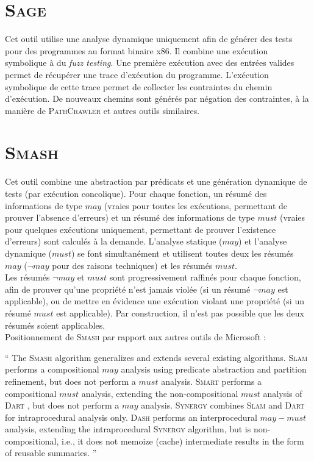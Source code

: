 \section{\textsc{Sage}}

Cet outil \cite{SAGE} utilise une analyse dynamique uniquement afin de générer
des tests pour des programmes au format binaire x86. Il combine une exécution
symbolique à du {\em fuzz testing}. Une première exécution avec des entrées
valides permet de récupérer une trace d'exécution du programme. L'exécution
symbolique de cette trace permet de collecter les contraintes du chemin
d'exécution. De nouveaux chemins sont générés par négation des contraintes,
à la manière de \textsc{PathCrawler} \cite{PathCrawler} et autres outils
similaires.

\section{\textsc{Smash}}

Cet outil \cite{SMASH} combine une abstraction par prédicats et une génération
dynamique de tests (par exécution concolique). Pour chaque fonction, un résumé
des informations de type $may$ (vraies pour toutes les exécutions, permettant de
prouver l'absence d'erreurs) et un résumé des informations de type $must$
(vraies pour quelques exécutions uniquement, permettant de prouver l'existence
d'erreurs) sont calculés à la demande. L'analyse statique ($may$) et l'analyse
dynamique ($must$) se font simultanément et utilisent toutes deux les résumés
$may$ ($\lnot may$ pour des raisons techniques) et les résumés $must$.\\

Les résumés $\lnot may$ et $must$ sont progressivement raffinés pour chaque
fonction, afin de prouver qu'une propriété n'est jamais violée (si un résumé
$\lnot may$ est applicable), ou de mettre en évidence une exécution violant une
propriété (si un résumé $must$ est applicable). Par construction, il n'est pas
possible que les deux résumés soient applicables.\\

Positionnement de \textsc{Smash} \cite{SMASH} par rapport aux autres outils de
Microsoft :
\begin{shaded}
`` The \textsc{Smash} \cite{SMASH} algorithm generalizes and extends several
existing algorithms. \textsc{Slam} \cite{SLAM} performs a compositional $may$
analysis using predicate abstraction and partition refinement, but does not
perform a $must$ analysis. \textsc{Smart} \cite{SMART} performs a compositional
$must$ analysis, extending the non-compositional $must$ analysis of
\textsc{Dart} \cite{DART}, but does not perform a $may$ analysis.
\textsc{Synergy} \cite{SYNERGY} combines \textsc{Slam} \cite{SLAM} and
\textsc{Dart} \cite{DART} for intraprocedural analysis only. \textsc{Dash}
\cite{DASH} performs an interprocedural $may-must$ analysis, extending the
intraprocedural \textsc{Synergy} \cite{SYNERGY} algorithm, but is
non-compositional, i.e., it does not memoize (cache) intermediate results in the
form of reusable summaries. ''
\end{shaded}

